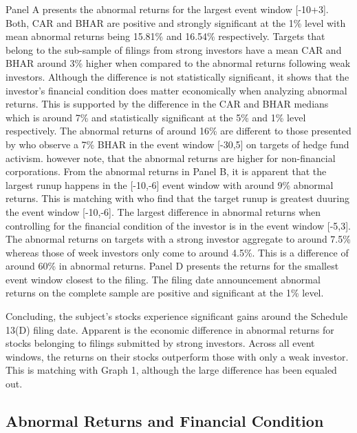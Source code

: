 \documentclass[12pt]{article}
\begin{document}

Panel A presents the abnormal returns for the largest event window [-10+3]. Both, CAR and BHAR are positive and strongly significant at the 1\% level with mean abnormal returns being 15.81\% and 16.54\% respectively. Targets that belong to the sub-sample of filings from strong investors have a mean CAR and BHAR around 3\% higher when compared to the abnormal returns following weak investors. 
Although the difference is not statistically significant, it shows that the investor's financial condition does matter economically when analyzing abnormal returns. This is supported by the difference in the CAR and BHAR medians which is around 7\% and statistically significant at the 5\% and 1\% level respectively. The abnormal returns of around 16\% are different to those presented by \citet[p.208]{Klein2009} who observe a 7\% BHAR in the event window [-30,5] on targets of hedge fund activism. \citet{Brigida2012} however note, that the abnormal returns are higher for non-financial corporations. 
From the abnormal returns in Panel B, it is apparent that the largest runup happens in the [-10,-6] event window with around 9\% abnormal returns. This is matching with \citet[p.32]{Brigida2012} who find that the target runup is greatest duuring the event window [-10,-6]. 
The largest difference in abnormal returns when controlling for the financial condition of the investor is in the event window [-5,3]. The abnormal returns on targets with a strong investor aggregate to around 7.5\% whereas those of week investors only come to around 4.5\%. This is a difference of around 60\% in abnormal returns. 
Panel D presents the returns for the smallest event window closest to the filing. The filing date announcement abnormal returns on the complete sample are positive and significant at the 1\% level.

Concluding, the subject's stocks experience significant gains around the Schedule 13(D) filing date. Apparent is the economic difference in abnormal returns for stocks belonging to filings submitted by strong investors. Across all event windows, the returns on their stocks outperform those with only a weak investor. This is matching with Graph 1, although the large difference has been equaled out.

\pagebreak

\subsection{Abnormal Returns and Financial Condition}
\end{document}

